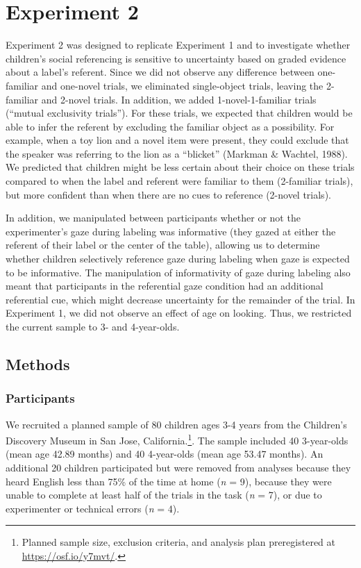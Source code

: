 \documentclass[10pt, letterpaper]{article}
\begin{document}
\section{Experiment 2}\label{experiment-2}

Experiment 2 was designed to replicate Experiment 1 and to investigate
whether children's social referencing is sensitive to uncertainty based
on graded evidence about a label's referent. Since we did not observe
any difference between one-familiar and one-novel trials, we eliminated
single-object trials, leaving the 2-familiar and 2-novel trials. In
addition, we added 1-novel-1-familiar trials (``mutual exclusivity
trials''). For these trials, we expected that children would be able to
infer the referent by excluding the familiar object as a possibility.
For example, when a toy lion and a novel item were present, they could
exclude that the speaker was referring to the lion as a ``blicket''
(Markman \& Wachtel, 1988). We predicted that children might be less
certain about their choice on these trials compared to when the label
and referent were familiar to them (2-familiar trials), but more
confident than when there are no cues to reference (2-novel trials).

In addition, we manipulated between participants whether or not the
experimenter's gaze during labeling was informative (they gazed at
either the referent of their label or the center of the table), allowing
us to determine whether children selectively reference gaze during
labeling when gaze is expected to be informative. The manipulation of
informativity of gaze during labeling also meant that participants in
the referential gaze condition had an additional referential cue, which
might decrease uncertainty for the remainder of the trial. In Experiment
1, we did not observe an effect of age on looking. Thus, we restricted
the current sample to 3- and 4-year-olds.

\subsection{Methods}\label{methods-1}

\subsubsection{Participants}\label{participants-1}

We recruited a planned sample of 80 children ages 3-4 years from the
Children's Discovery Museum in San Jose, California.\footnote{Planned
  sample size, exclusion criteria, and analysis plan preregistered at
  \url{https://osf.io/y7mvt/}.}. The sample included 40 3-year-olds
(mean age 42.89 months) and 40 4-year-olds (mean age 53.47 months). An
additional 20 children participated but were removed from analyses
because they heard English less than 75\% of the time at home (\emph{n}
= 9), because they were unable to complete at least half of the trials
in the task (\emph{n} = 7), or due to experimenter or technical errors
(\emph{n} = 4).
\end{document}
